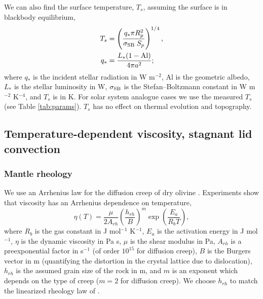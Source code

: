 We can also find the surface temperature, $T_s$, assuming the surface is in blackbody equilibrium,
\begin{align}
T_s &= \left(\frac{q_* \pi R_p^2}{\sigma_{\rm SB} \; S_p}\right)^{1/4},\\
q_* &= \frac{L_*(1-{\rm Al})}{4 \pi a^2};
\end{align}
where $q_*$ is the incident stellar radiation in W m$^{-2}$, Al is the geometric albedo, $L_*$ is the stellar luminosity in W, $\sigma_{\rm SB}$ is the Stefan–Boltzmann constant in W m$^{-2}$ K$^{-4}$, and $T_s$ is in K. For solar system analogue cases we use the measured $T_s$ (see Table \ref{tab:params}). $T_s$ has no effect on thermal evolution and topography.




\subsection{Temperature-dependent viscosity, stagnant lid convection}\label{sec:viscosity-model}

\subsubsection{Mantle rheology}

We use an Arrhenius law for the diffusion creep of dry olivine \citep{Karato1993}. Experiments show that viscosity has an Arrhenius dependence on temperature,
\begin{equation}
\eta(T) = \frac{\mu}{2 A_{rh}} \left(\frac{h_{rh}}{B}\right)^m \exp\left(\frac{E_a}{R_b T}\right),
\end{equation}
where $R_b$ is the gas constant in J mol$^{-1}$ K$^{-1}$, $E_a$ is the activation energy in J mol$^{-1}$, $\eta$ is the dynamic viscosity in Pa s, $\mu$ is the shear modulus in Pa, $A_{rh}$ is a preexponential factor in s$^{-1}$ (of order $10^{15}$ for diffusion creep), $B$ is the Burgers vector in m (quantifying the distortion in the crystal lattice due to dislocation), $h_{rh}$ is the assumed grain size of the rock in m, and $m$ is an exponent which depends on the type of creep ($m=2$ for diffusion creep). We choose $h_{rh}$ to match the linearized rheology law of \citet{Thiriet2019}.

